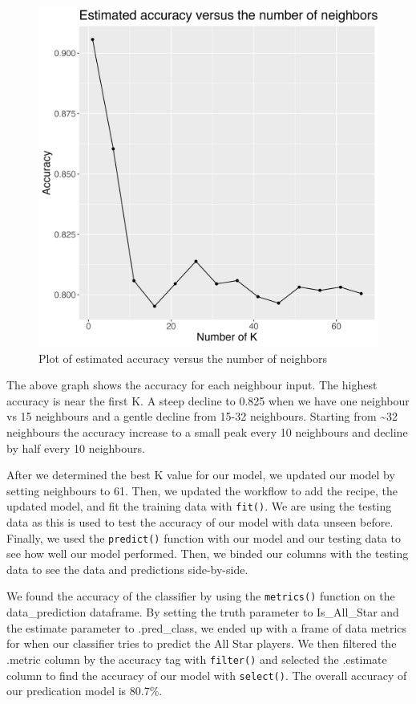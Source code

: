 \documentclass[
]{article}
\begin{document}
\begin{figure}
\includegraphics[width=0.8\linewidth]{results/accuracy_vs_k} \caption{Plot of estimated accuracy versus the number of neighbors}\label{fig:fig1}
\end{figure}

The above graph shows the accuracy for each neighbour input. The highest accuracy is near the first K. A steep decline to 0.825 when we have one neighbour vs 15 neighbours and a gentle decline from 15-32 neighbours. Starting from \textasciitilde32 neighbours the accuracy increase to a small peak every 10 neighbours and decline by half every 10 neighbours.

After we determined the best K value for our model, we updated our model by setting neighbours to 61. Then, we updated the workflow to add the recipe, the updated model, and fit the training data with \texttt{fit()}. We are using the testing data as this is used to test the accuracy of our model with data unseen before. Finally, we used the \texttt{predict()} function with our model and our testing data to see how well our model performed. Then, we binded our columns with the testing data to see the data and predictions side-by-side.

We found the accuracy of the classifier by using the \texttt{metrics()} function on the data\_prediction dataframe. By setting the truth parameter to Is\_All\_Star and the estimate parameter to .pred\_class, we ended up with a frame of data metrics for when our classifier tries to predict the All Star players. We then filtered the .metric column by the accuracy tag with \texttt{filter()} and selected the .estimate column to find the accuracy of our model with \texttt{select()}. The overall accuracy of our predication model is 80.7\%.
\end{document}
